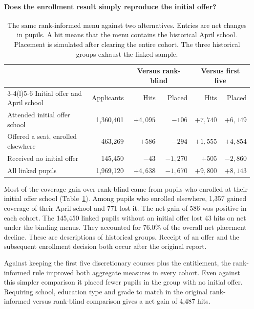 \paragraph{Does the enrollment result simply reproduce the initial offer?}
\begin{table}[ht]\centering\small
\caption{The same rank-informed menu against two alternatives. Entries are net changes in pupils. A hit means that the menu contains the historical April school. Placement is simulated after clearing the entire cohort. The three historical groups exhaust the linked sample.}\label{tab:concordance}
\begin{tabular}{@{}lrrr@{\hskip 1.2em}rr@{}}\toprule
& & \multicolumn{2}{c}{Versus rank-blind} & \multicolumn{2}{c}{Versus first five}\\
\cmidrule(lr){3-4}\cmidrule(l){5-6}
Initial offer and April school & Applicants & Hits & Placed & Hits & Placed\\\midrule
Attended initial offer school & 1,360,401 & $+4{,}095$ & $-106$ & $+7{,}740$ & $+6{,}149$\\
Offered a seat, enrolled elsewhere & 463,269 & $+586$ & $-294$ & $+1{,}555$ & $+4{,}854$\\
Received no initial offer & 145,450 & $-43$ & $-1{,}270$ & $+505$ & $-2{,}860$\\\midrule
All linked pupils & 1,969,120 & $+4{,}638$ & $-1{,}670$ & $+9{,}800$ & $+8{,}143$\\\bottomrule
\end{tabular}
\end{table}

Most of the coverage gain over rank-blind came from pupils who enrolled at their initial offer school (Table~\ref{tab:concordance}). Among pupils who enrolled elsewhere, 1,357 gained coverage of their April school and 771 lost it. The net gain of 586 was positive in each cohort. The 145,450 linked pupils without an initial offer lost 43 hits on net under the binding menus. They accounted for 76.0\% of the overall net placement decline. These are descriptions of historical groups. Receipt of an offer and the subsequent enrollment decision both occur after the original report.

Against keeping the first five discretionary courses plus the entitlement, the rank-informed rule improved both aggregate measures in every cohort. Even against this simpler comparison it placed fewer pupils in the group with no initial offer. Requiring school, education type and grade to match in the original rank-informed versus rank-blind comparison gives a net gain of 4,487 hits.

